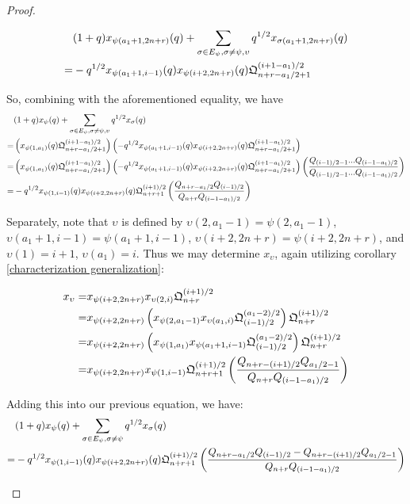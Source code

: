 \documentclass{amsart}
\begin{document}
\begin{proof}
\begin{enumerate}[label={case \arabic*:}]
		\begin{align*}
		&(1+q)x_{\psi(a_1+1,2n+r)}(q)+\sum_{\sigma\in E_\psi,\sigma\not=\psi,\upsilon}q^{1/2}x_{\sigma(a_1+1,2n+r)}(q)\\
		=&-q^{1/2}x_{\psi(a_1+1,i-1)}(q)x_{\psi(i+2,2n+r)}(q)\mathfrak{Q}_{n+r-a_1/2+1}^{(i+1-a_1)/2}
		\end{align*}
		
		So, combining with the aforementioned equality, we have 
		\begin{align*}
		&(1+q)x_\psi(q)+\sum_{\sigma\in E_\psi,\sigma\not=\psi,\upsilon}q^{1/2}x_\sigma(q)\\
		=&\left( x_{\psi(1,a_1)}(q)\mathfrak{Q}_{n+r-a_1/2+1}^{(i+1-a_1)/2} \right)\left( -q^{1/2}x_{\psi(a_1+1,i-1)}(q)x_{\psi(i+2,2n+r)}(q)\mathfrak{Q}_{n+r-a_1/2+1}^{(i+1-a_1)/2} \right)\\
		=&\left( x_{\psi(1,a_1)}(q)\mathfrak{Q}_{n+r-a_1/2+1}^{(i+1-a_1)/2} \right)\left( -q^{1/2}x_{\psi(a_1+1,i-1)}(q)x_{\psi(i+2,2n+r)}(q)\mathfrak{Q}_{n+r-a_1/2+1}^{(i+1-a_1)/2} \right)\left( \frac{Q_{(i-1)/2-1}...Q_{(i-1-a_1)/2}}{Q_{(i-1)/2-1}...Q_{(i-1-a_1)/2}} \right)\\
		=&-q^{1/2}x_{\psi(1,i-1)}(q)x_{\psi(i+2,2n+r)}(q)\mathfrak{Q}_{n+r+1}^{(i+1)/2}\left( \frac{Q_{n+r-a_1/2}Q_{(i-1)/2}}{Q_{n+r}Q_{(i-1-a_1)/2}} \right)
		\end{align*}
		
		Separately, note that $\upsilon$ is defined by $\upsilon(2,a_1-1)=\psi(2,a_1-1)$, $\upsilon(a_1+1,i-1)=\psi(a_1+1,i-1)$, $\upsilon(i+2,2n+r)=\psi(i+2,2n+r)$, and $\upsilon(1)=i+1$, $\upsilon(a_1)=i$. Thus we may determine $x_\upsilon$, again utilizing corollary \ref{characterization generalization}:
		
		\begin{align*}
		x_\upsilon=&x_{\psi(i+2,2n+r)}x_{\upsilon(2,i)}\mathfrak{Q}_{n+r}^{(i+1)/2}\\
		=&x_{\psi(i+2,2n+r)}\left( x_{\psi(2,a_1-1)}x_{\upsilon(a_1,i)}\mathfrak{Q}_{(i-1)/2}^{(a_1-2)/2} \right)\mathfrak{Q}_{n+r}^{(i+1)/2}\\
		=&x_{\psi(i+2,2n+r)}\left( x_{\psi(1,a_1)}x_{\psi(a_1+1,i-1)}\mathfrak{Q}_{(i-1)/2}^{(a_1-2)/2} \right)\mathfrak{Q}_{n+r}^{(i+1)/2}\\
		=&x_{\psi(i+2,2n+r)}x_{\psi(1,i-1)}\mathfrak{Q}_{n+r+1}^{(i+1)/2}\left( \frac{Q_{n+r-(i+1)/2}Q_{a_1/2-1}}{Q_{n+r}Q_{(i-1-a_1)/2}} \right)
		\end{align*}
		
		Adding this into our previous equation, we have:
		\begin{align*}
		&(1+q)x_\psi(q)+\sum_{\sigma\in E_\psi,\sigma\not=\psi}q^{1/2}x_\sigma(q)\\
		=&-q^{1/2}x_{\psi(1,i-1)}(q)x_{\psi(i+2,2n+r)}(q)\mathfrak{Q}_{n+r+1}^{(i+1)/2}\left( \frac{Q_{n+r-a_1/2}Q_{(i-1)/2}-Q_{n+r-(i+1)/2}Q_{a_1/2-1}}{Q_{n+r}Q_{(i-1-a_1)/2}} \right)
		\end{align*}
		

\end{enumerate}
\end{proof}
\end{document}
